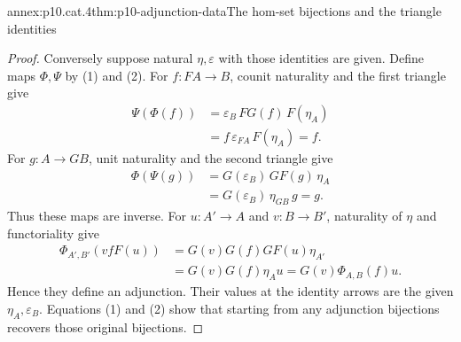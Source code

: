 \begin{annexitem}{annex:p10.cat.4}{thm:p10-adjunction-data}{The hom-set bijections and the triangle identities}
\begin{proof}
Conversely suppose natural \(\eta,\varepsilon\) with those
identities are given.  Define maps \(\Phi,\Psi\) by (1) and (2).
For \(f:F A\to B\), counit naturality and the first triangle give
\[
 \begin{aligned}
 \Psi(\Phi(f))
   &=\varepsilon_B\,FG(f)\,F(\eta_A)\\
   &=f\,\varepsilon_{F A}\,F(\eta_A)=f.
 \end{aligned}
\]
For \(g:A\to G B\), unit naturality and the second triangle give
\[
 \begin{aligned}
 \Phi(\Psi(g))
   &=G(\varepsilon_B)\,GF(g)\,\eta_A\\
   &=G(\varepsilon_B)\,\eta_{G B}\,g=g.
 \end{aligned}
\]
Thus these maps are inverse.
For \(u:A'\to A\) and \(v:B\to B'\), naturality of \(\eta\)
and functoriality give
\[
 \begin{aligned}
 \Phi_{A',B'}(v f F(u))
   &=G(v)G(f)GF(u)\eta_{A'}\\
   &=G(v)G(f)\eta_A u
    =G(v)\Phi_{A,B}(f)u.
 \end{aligned}
\]
Hence they define an adjunction.
Their values at the identity arrows are the given
\(\eta_A,\varepsilon_B\).
Equations (1) and (2) show that starting from any adjunction
bijections recovers those original bijections.
\end{proof}
\end{annexitem}

